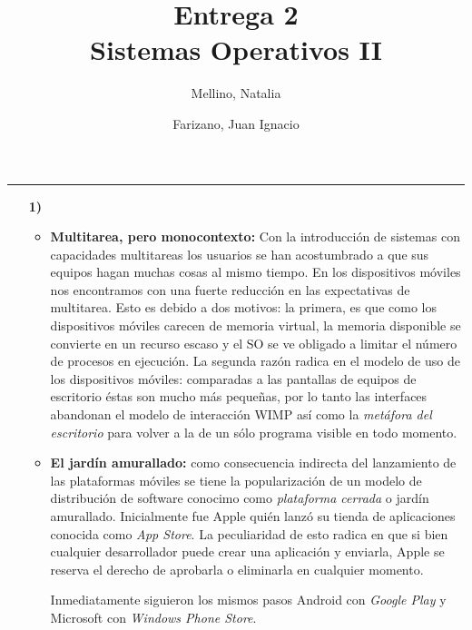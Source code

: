 \documentclass[11pt]{article}
\title{
    Entrega 2 \\
    \large Sistemas Operativos II}
\author{Mellino, Natalia \and Farizano, Juan Ignacio}
\date{}
\begin{document}
\maketitle
\noindent\rule{\textwidth}{1pt}

\begin{enumerate}[1)]
  \section*{Historia}
  \item[\textbf{1)}]  
    \begin{itemize}
      \item \textbf{Multitarea, pero monocontexto:}
        Con la introducción de sistemas con capacidades multitareas los usuarios
        se han acostumbrado a que sus equipos hagan muchas cosas al mismo tiempo.
        En los dispositivos móviles nos encontramos con una fuerte reducción en
        las expectativas de multitarea. Esto es debido a dos motivos: la primera,
        es que como los dispositivos móviles carecen de memoria virtual, la memoria 
        disponible se convierte en un recurso escaso y el SO se ve obligado a limitar el
        número de procesos en ejecución. La segunda razón radica en el modelo de uso
        de los dispositivos móviles: comparadas a las pantallas de equipos de escritorio
        éstas son mucho más pequeñas, por lo tanto las interfaces abandonan el modelo 
        de interacción WIMP así como la \emph{metáfora del escritorio} para volver a la de un
        sólo programa visible en todo momento.
        
      \item \textbf{El jardín amurallado:} como consecuencia indirecta del lanzamiento
      de las plataformas móviles se tiene la popularización de un modelo de distribución
      de software conocimo como \emph{plataforma cerrada} o jardín amurallado. Inicialmente fue 
      Apple quién lanzó su tienda de aplicaciones conocida como \emph{App Store}. La 
      peculiaridad de esto radica en que si bien cualquier desarrollador puede crear una
      aplicación y enviarla, Apple se reserva el derecho de aprobarla o eliminarla en
      cualquier momento.

      Inmediatamente siguieron los mismos pasos Android con \emph{Google Play} y Microsoft 
      con \emph{Windows Phone Store}. 


\end{itemize}
\end{enumerate}
\end{document}
